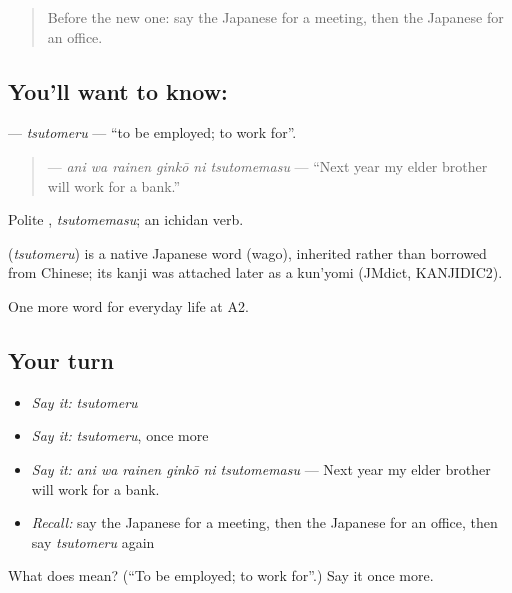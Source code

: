 \label{lesson:JA-C229-tsutomeru}



\begin{quote}
Before the new one: say the Japanese for a meeting, then the Japanese for an office.
\end{quote}

\subsection*{You'll want to know: }
\textbf{} — \emph{tsutomeru} — \textquotedblleft{}to be employed; to work for\textquotedblright{}.

\begin{quote}
\textbf{   } — \emph{ani wa rainen ginkō ni tsutomemasu} — \textquotedblleft{}Next year my elder brother will work for a bank.\textquotedblright{}
\end{quote}

Polite \textbf{}, \emph{tsutomemasu}; an ichidan verb.

\begin{cousinweb}
\textbf{} (\emph{tsutomeru}) is a native Japanese word (wago), inherited rather than borrowed from Chinese; its kanji was attached later as a kun'yomi (JMdict, KANJIDIC2).
\end{cousinweb}

\begin{grammarlens}[title={What you've built}]
One more word for everyday life at A2.
\end{grammarlens}

\subsection*{Your turn}
\begin{itemize}
\raggedright
  \item \emph{Say it:} \emph{tsutomeru}
  \item \emph{Say it:} \emph{tsutomeru}, once more
  \item \emph{Say it:} \emph{ani wa rainen ginkō ni tsutomemasu} — Next year my elder brother will work for a bank.
  \item \emph{Recall:} say the Japanese for a meeting, then the Japanese for an office, then say \emph{tsutomeru} again
\end{itemize}

\begin{tcolorbox}[breakable,colback=teal!4,colframe=teal!35!black,title={Before you move on}]
What does  mean? (\textquotedblleft{}To be employed; to work for\textquotedblright{}.) Say it once more.
\end{tcolorbox}
